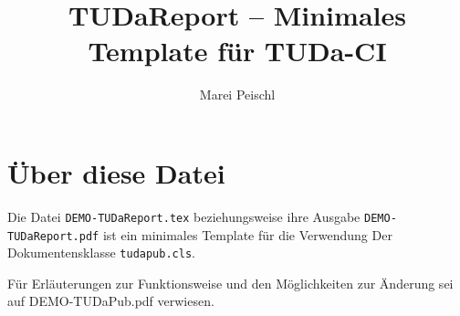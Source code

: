 \documentclass[
	ngerman,
	accentcolor=9c,%
	type=intern,
	marginpar=false
	]{tudapub}
\let\file\texttt
\begin{document}
\title{TUDaReport -- Minimales Template für TUDa-CI}
\author{Marei Peischl}

\maketitle

\tableofcontents

\section{Über diese Datei}
Die Datei \file{DEMO-TUDaReport.tex} beziehungsweise ihre Ausgabe \file{DEMO-TUDaReport.pdf} ist ein minimales Template für die Verwendung Der Dokumentensklasse \file{tudapub.cls}.


Für Erläuterungen zur Funktionsweise und den Möglichkeiten zur Änderung sei auf DEMO-TUDaPub.pdf verwiesen.
\end{document}
